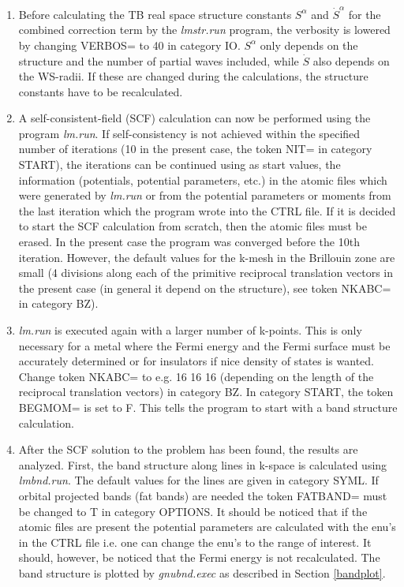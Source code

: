 \documentclass[aps,twocolumn,a4]{revtex4}
\begin{document}
\begin{enumerate}
\item Before calculating
the TB real space structure constants $S^\alpha $ and $\dot
S^\alpha $ for the combined correction term by the
{\em lmstr.run} program, the verbosity is lowered by changing
VERBOS= to 40 in category IO.
$S^\alpha $ only depends on the structure
and the number of partial waves included, while $\dot S$ also depends on
the WS-radii.  If these are changed during the calculations, the
structure constants have to be recalculated.

\item A self-consistent-field (SCF) calculation can now be performed
using the program {\em lm.run}.  If self-consistency is not
achieved within the specified number of iterations (10 in the present
case, the token NIT= in category START), the iterations can
be continued using as start values, the information (potentials,
potential parameters, etc.) in
the atomic files which were generated by {\em lm.run} or from the
potential parameters or moments from the last iteration which the
program wrote into the CTRL file.
If it is decided to start the SCF calculation from scratch, then the
atomic files must be erased. In the present case
the program was converged before the 10th iteration. However, the
default values for the k-mesh in the Brillouin zone are small (4
divisions along each of the primitive reciprocal translation vectors in
the present case (in general it depend on the structure),
see token NKABC= in category BZ).

\item {\em lm.run} is executed again with a larger number of k-points.
This is only necessary for a metal where the Fermi energy and the
Fermi surface must be accurately determined or for insulators if
nice density of states is wanted.
Change token NKABC= to e.g. 16 16 16 (depending on the length of the
reciprocal translation vectors) in category BZ. In category
START, the token BEGMOM= is set to F. This tells the
program to start with a band structure calculation.

\item After the SCF solution to the problem has been found, the results
are analyzed. First,
the band structure along lines in k-space is calculated
using {\em lmbnd.run}. The default values for the lines are given in
category SYML. If orbital projected bands (fat bands) are needed
the token FATBAND= must be changed to T in category OPTIONS. It should
be noticed that if the atomic files are present the potential
parameters are calculated with the enu's in the CTRL file i.e. one can
change the enu's to the range of interest. It should, however, be
noticed that the Fermi energy is not recalculated.
The band structure is plotted by {\em gnubnd.exec} as described in
Section \ref{bandplot}.


\end{enumerate}
\end{document}

